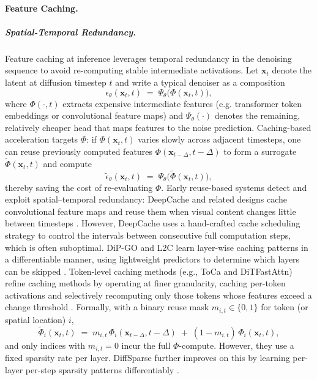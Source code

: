 \documentclass{llmxive}
\begin{document}
\paragraph{Feature Caching.}
\label{subsubsec:caching}

\subparagraph{Spatial-Temporal Redundancy.}
Feature caching at inference leverages temporal redundancy in the denoising sequence to avoid re-computing stable intermediate activations. Let \(\mathbf{x}_t\) denote the latent at diffusion timestep \(t\) and write a typical denoiser as a composition
\begin{equation}
\epsilon_{\theta}(\mathbf{x}_t,t) \;=\; \Psi_\theta\big(\Phi(\mathbf{x}_t,t)\big),
\label{eq:denoiser-decomp}
\end{equation}
where \(\Phi(\cdot,t)\) extracts expensive intermediate features (e.g. transformer token embeddings or convolutional feature maps) and \(\Psi_\theta(\cdot)\) denotes the remaining, relatively cheaper head that maps features to the noise prediction. Caching-based acceleration targets \(\Phi\): if \(\Phi(\mathbf{x}_t,t)\) varies slowly across adjacent timesteps, one can reuse previously computed features \(\Phi(\mathbf{x}_{t-\Delta},t-\Delta)\) to form a surrogate \(\tilde{\Phi}(\mathbf{x}_t,t)\) and compute
\[
\tilde{\epsilon}_\theta(\mathbf{x}_t,t) \;=\; \Psi_\theta\big(\tilde{\Phi}(\mathbf{x}_t,t)\big),
\]
thereby saving the cost of re-evaluating \(\Phi\). Early reuse-based systems detect and exploit spatial–temporal redundancy: DeepCache and related designs cache convolutional feature maps and reuse them when visual content changes little between timesteps \citep{ma2024deepcache}. 
However, DeepCache uses a hand-crafted cache scheduling strategy to control the intervals between consecutive full computation steps, which is often suboptimal. 
DiP-GO and L2C learn layer-wise caching patterns in a differentiable manner, using lightweight predictors to determine which layers can be skipped \citep{zhu2024dip, ma2024learning}. Token-level caching methods (e.g., ToCa and DiTFastAttn) refine caching methods by operating at finer granularity, caching per-token activations and selectively recomputing only those tokens whose features exceed a change threshold \citep{chen2024delta-dit,liu2024timestep,zou2024accelerating, yuan2024ditfastattn}. 
Formally, with a binary reuse mask \(m_{i,t}\in\{0,1\}\) for token (or spatial location) \(i\),
\begin{equation}
\tilde{\Phi}_i(\mathbf{x}_t,t) \;=\; m_{i,t}\,\Phi_i(\mathbf{x}_{t-\Delta},t-\Delta)\;+\;(1-m_{i,t})\,\Phi_i(\mathbf{x}_t,t),
\end{equation}
and only indices with \(m_{i,t}=0\) incur the full \(\Phi\)-compute.
However, they use a fixed sparsity rate per layer. DiffSparse further improves on this by learning per-layer per-step sparsity patterns differentiably \citep{zhu2026diffsparse}.
\end{document}
